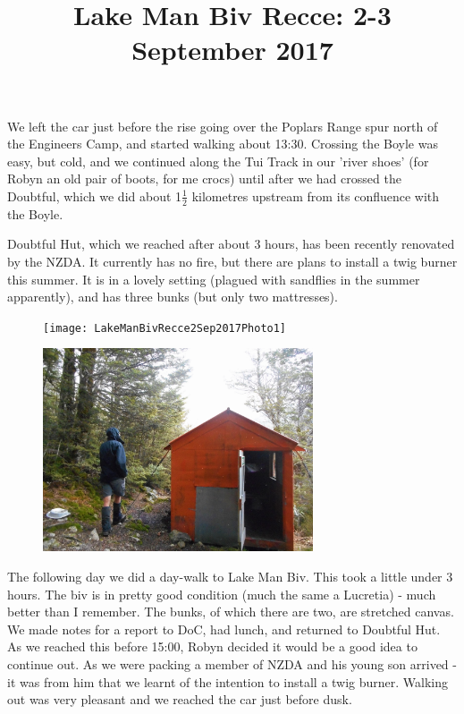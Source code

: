 \documentclass[12pt]{article} %
\title{Lake Man Biv Recce: 2-3 September 2017}
\makeatletter
\renewcommand{\maketitle}{%
  {\bfseries{\scshape{\Large{\@title\par}}}}
}
\makeatother
\begin{document}
  \maketitle
We left the car just before the rise going over the Poplars Range spur north of the Engineers Camp, and started walking about 13:30.  Crossing the Boyle was easy, but cold, and we continued along the Tui Track in our 'river shoes' (for Robyn an old pair of boots, for me crocs) until after we had crossed the Doubtful, which we did about 1$\frac{1}{2}$ kilometres upstream from its confluence with the Boyle.

Doubtful Hut, which we reached after about 3 hours, has been recently renovated by the NZDA.  It currently has no fire, but there are plans to install a twig burner this summer.  It is in a lovely setting (plagued with sandflies in the summer apparently), and has three bunks (but only two mattresses).

\begin{figure}[ht]
\begin{minipage}{.5\linewidth}
\begin{flushleft}
   \texttt{[image: LakeManBivRecce2Sep2017Photo1]}
\end{flushleft}
\end{minipage}
\begin{minipage}{.5\linewidth}
\begin{center}
   \includegraphics[width=8cm, angle=270]{LakeManBivRecce2Sep2017Photo2}
\end{center}
\end{minipage}
\end{figure}

The following day we did a day-walk to Lake Man Biv.  This took a little under 3 hours.  The biv is in pretty good condition (much the same a Lucretia) - much better than I remember.  The bunks, of which there are two, are stretched canvas.  We made notes for a report to DoC, had lunch, and returned to Doubtful Hut.  As we reached this before 15:00, Robyn decided it would be a good idea to continue out.  As we were packing a member of NZDA and his young son arrived - it was from him that we learnt of the intention to install a twig burner.  Walking out was very pleasant and we reached the car just before dusk.
\end{document}
